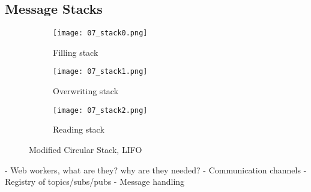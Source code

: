         

    \subsection{Message Stacks}

        \begin{figure}[htbp]
            \centering
            \begin{subfigure}[t]{0.32\textwidth}
                \texttt{[image: 07\_stack0.png]}
                \caption{Filling stack}
            \end{subfigure}
            \begin{subfigure}[t]{0.32\textwidth}
                \texttt{[image: 07\_stack1.png]}
                \caption{Overwriting stack}
            \end{subfigure}
            \begin{subfigure}[t]{0.32\textwidth}
                \texttt{[image: 07\_stack2.png]}
                \caption{Reading stack}
            \end{subfigure}
            \caption{Modified Circular Stack, \ac{LIFO}}
            \label{fig:circleStack}
        \end{figure}

    - Web workers, what are they? why are they needed?
    - Communication channels
    - Registry of topics/subs/pubs
    - Message handling

